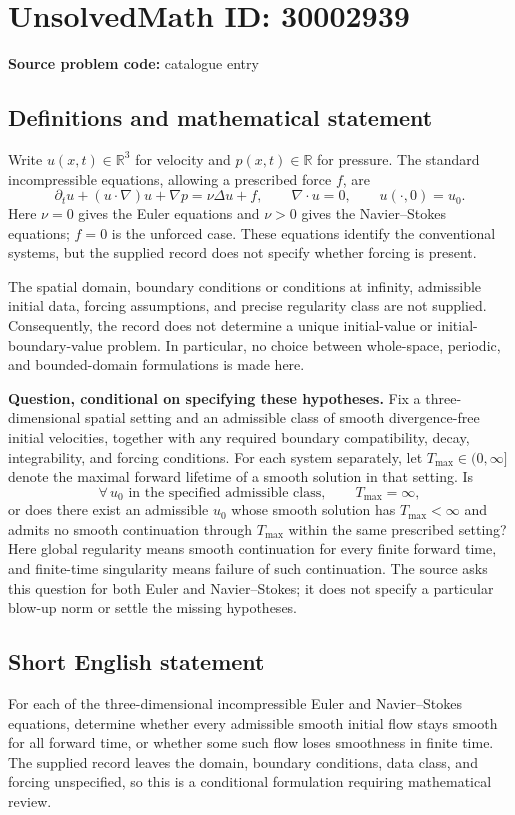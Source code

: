 \documentclass[11pt]{article}
\newcommand{\R}{\mathbb{R}}
\begin{document}
\section*{UnsolvedMath ID: 30002939}
\textbf{Source problem code:} catalogue entry
\subsection{Definitions and mathematical statement}
Write \(u(x,t)\in\R^3\) for velocity and \(p(x,t)\in\R\) for pressure. The standard incompressible equations, allowing a prescribed force \(f\), are
\[
\partial_t u+(u\cdot\nabla)u+\nabla p=\nu\Delta u+f,
\qquad \nabla\cdot u=0,
\qquad u(\cdot,0)=u_0.
\]
Here \(\nu=0\) gives the Euler equations and \(\nu>0\) gives the Navier--Stokes equations; \(f=0\) is the unforced case. These equations identify the conventional systems, but the supplied record does not specify whether forcing is present.

The spatial domain, boundary conditions or conditions at infinity, admissible initial data, forcing assumptions, and precise regularity class are not supplied. Consequently, the record does not determine a unique initial-value or initial-boundary-value problem. In particular, no choice between whole-space, periodic, and bounded-domain formulations is made here.

\textbf{Question, conditional on specifying these hypotheses.} Fix a three-dimensional spatial setting and an admissible class of smooth divergence-free initial velocities, together with any required boundary compatibility, decay, integrability, and forcing conditions. For each system separately, let \(T_{\max}\in(0,\infty]\) denote the maximal forward lifetime of a smooth solution in that setting. Is
\[
\forall\,u_0\text{ in the specified admissible class},
\qquad T_{\max}=\infty,
\]
or does there exist an admissible \(u_0\) whose smooth solution has \(T_{\max}<\infty\) and admits no smooth continuation through \(T_{\max}\) within the same prescribed setting? Here global regularity means smooth continuation for every finite forward time, and finite-time singularity means failure of such continuation. The source asks this question for both Euler and Navier--Stokes; it does not specify a particular blow-up norm or settle the missing hypotheses.
\subsection{Short English statement}
For each of the three-dimensional incompressible Euler and Navier--Stokes equations, determine whether every admissible smooth initial flow stays smooth for all forward time, or whether some such flow loses smoothness in finite time. The supplied record leaves the domain, boundary conditions, data class, and forcing unspecified, so this is a conditional formulation requiring mathematical review.
\end{document}
